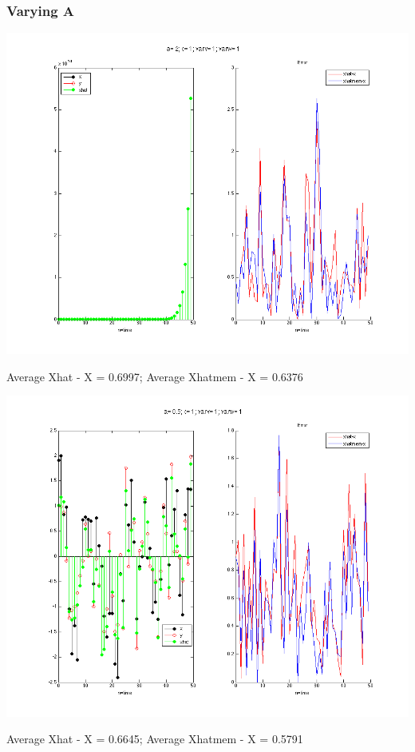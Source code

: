 \documentclass[leqno]{article}
\begin{document}
\subsubsection{Varying A}
\begin{center}
\includegraphics[scale=0.3]{fig3}
\end{center}
Average Xhat - X = 0.6997; \quad Average Xhatmem - X = 0.6376\\

\begin{center}
\includegraphics[scale=0.3]{fig4}
\end{center}
Average Xhat - X = 0.6645; \quad Average Xhatmem - X = 0.5791\\
\end{document}

